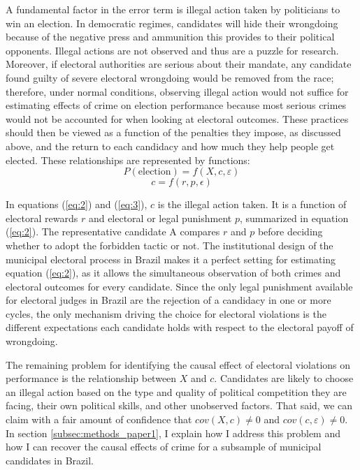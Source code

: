\documentclass[11pt]{article}
\newcommand{\refp}[1]{(\ref{#1})}
\begin{document}
A fundamental factor in the error term is illegal action taken by politicians to win an election. In democratic regimes, candidates will hide their wrongdoing because of the negative press and ammunition this provides to their political opponents. Illegal actions are not observed and thus are a puzzle for research. Moreover, if electoral authorities are serious about their mandate, any candidate found guilty of severe electoral wrongdoing would be removed from the race; therefore, under normal conditions, observing illegal action would not suffice for estimating effects of crime on election performance because most serious crimes would not be accounted for when looking at electoral outcomes. These practices should then be viewed as a function of the penalties they impose, as discussed above, and the return to each candidacy and how much they help people get elected. These relationships are represented by functions:
\begin{equation} \label{eq:2}
  P(\text{election}) = f(X, c, \varepsilon)
\end{equation}
\begin{equation} \label{eq:3}
  c = f(r, p, \epsilon)
\end{equation}

In equations \refp{eq:2} and \refp{eq:3}, $c$ is the illegal action taken. It is a function of electoral rewards $r$ and electoral or legal punishment $p$, summarized in equation \refp{eq:2}. The representative candidate A compares $r$ and $p$ before deciding whether to adopt the forbidden tactic or not. The institutional design of the municipal electoral process in Brazil makes it a perfect setting for estimating equation \refp{eq:2}, as it allows the simultaneous observation of both crimes and electoral outcomes for every candidate. Since the only legal punishment available for electoral judges in Brazil are the rejection of a candidacy in one or more cycles, the only mechanism driving the choice for electoral violations is the different expectations each candidate holds with respect to the electoral payoff of wrongdoing.

The remaining problem for identifying the causal effect of electoral violations on performance is the relationship between $X$ and $c$. Candidates are likely to choose an illegal action based on the type and quality of political competition they are facing, their own political skills, and other unobserved factors. That said, we can claim with a fair amount of confidence that $cov(X,c) \neq 0$ and $cov(c, \varepsilon) \neq 0$. In section \ref{subsec:methods_paper1}, I explain how I address this problem and how I can recover the causal effects of crime for a subsample of municipal candidates in Brazil.
\end{document}
